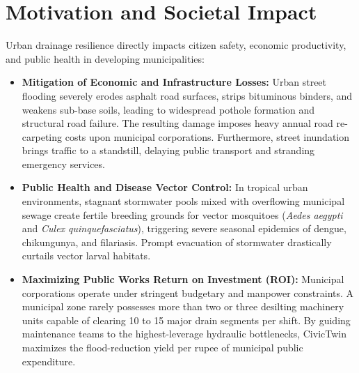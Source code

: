 \section{Motivation and Societal Impact}
Urban drainage resilience directly impacts citizen safety, economic productivity, and public health in developing municipalities:
\begin{itemize}
    \item \textbf{Mitigation of Economic and Infrastructure Losses:} Urban street flooding severely erodes asphalt road surfaces, strips bituminous binders, and weakens sub-base soils, leading to widespread pothole formation and structural road failure. The resulting damage imposes heavy annual road re-carpeting costs upon municipal corporations. Furthermore, street inundation brings traffic to a standstill, delaying public transport and stranding emergency services.
    \item \textbf{Public Health and Disease Vector Control:} In tropical urban environments, stagnant stormwater pools mixed with overflowing municipal sewage create fertile breeding grounds for vector mosquitoes (\textit{Aedes aegypti} and \textit{Culex quinquefasciatus}), triggering severe seasonal epidemics of dengue, chikungunya, and filariasis. Prompt evacuation of stormwater drastically curtails vector larval habitats.
    \item \textbf{Maximizing Public Works Return on Investment (ROI):} Municipal corporations operate under stringent budgetary and manpower constraints. A municipal zone rarely possesses more than two or three desilting machinery units capable of clearing 10 to 15 major drain segments per shift. By guiding maintenance teams to the highest-leverage hydraulic bottlenecks, CivicTwin maximizes the flood-reduction yield per rupee of municipal public expenditure.
\end{itemize}

